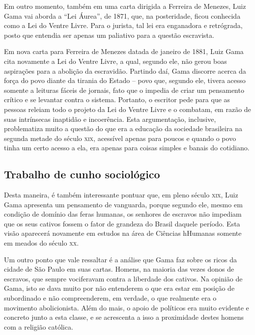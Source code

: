 \documentclass[12pt]{extarticle}
\begin{document}
Em outro momento, também em uma carta dirigida a Ferreira de Menezes,
Luiz Gama vai aborda a ``Lei Áurea'', de 1871, que, na posteridade, ficou
conhecida como a Lei do Ventre Livre. Para o jurista, tal lei era
enganadora e retrógrada, posto que entendia ser apenas um paliativo para
a questão escravista.

Em nova carta para Ferreira de Menezes datada de janeiro de 1881, Luiz
Gama cita novamente a Lei do Ventre Livre, a qual, segundo ele, não gerou
boas aspirações para a abolição da escravidão. Partindo daí, Gama
discorre acerca da força do povo diante da tirania do Estado -- povo que,
segundo ele, tivera acesso somente a leituras fáceis de jornais, fato que
o impedia de criar um pensamento crítico e se levantar contra o sistema.
Portanto, o escritor pede para que as pessoas releiam todo o projeto da
Lei do Ventre Livre e o combatam, em razão de suas intrínsecas inaptidão
e incoerência. Esta argumentação, inclusive, problematiza muito a
questão do que era a educação da sociedade brasileira na segunda metade
do século \textsc{xix}, acessível apenas para poucos e quando o povo tinha um
certo acesso a ela, era apenas para coisas simples e banais do
cotidiano.




\subsection{Trabalho de cunho sociológico}

Desta maneira, é também interessante pontuar que, em pleno século \textsc{xix},
Luiz Gama apresenta um pensamento de vanguarda, porque segundo ele,
mesmo em condição de domínio das feras humanas, os senhores de escravos
não impediam que os seus cativos fossem o fator de grandeza do Brasil
daquele período. Esta visão aparecerá novamente em estudos na
área de Ciências hHumanas somente em meados do século \textsc{xx}.

Um outro ponto que vale ressaltar é a análise que Gama faz sobre
os ricos da cidade de São Paulo em suas cartas. Homens, na maioria
das vezes donos de escravos, que sempre vociferavam contra a liberdade
dos cativos. Na opinião de Gama, isto se dava muito por não entenderem o
que era estar em posição de subordinado e não compreenderem, em verdade,
o que realmente era o movimento abolicionista. Além do mais, o apoio de
políticos era muito evidente e concreto junto a esta classe, e se
acrescenta a isso a proximidade destes homens com a religião católica.
\end{document}
